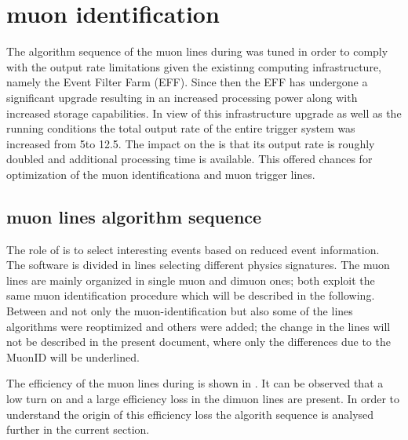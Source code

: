 \section{\hltone muon identification}
\label{sec:hlt1_rev}

The algorithm sequence of the \hltone muon lines during \runone was tuned in order to
comply with the output rate limitations given the existinng computing infrastructure,
namely the Event Filter Farm (EFF).
Since then the EFF has undergone a significant upgrade resulting in an increased processing
power along with increased storage capabilities.
In view of this infrastructure upgrade as well as the \runtwo \lhc running conditions
the total output rate of the entire trigger system was increased
from 5\khz to 12.5\khz.
The impact on the \hltone is that its output rate is roughly doubled and additional processing time is available.
This offered chances for optimization of the \hltone muon identificationa and muon trigger lines.

\subsection{\hltone muon lines algorithm sequence}
\label{sec:hlt1run2}

The role of \hltone is to select interesting events based on reduced event information.
The software is divided in lines selecting different physics signatures.
The \hltone muon lines are mainly organized in single muon and dimuon ones; both
exploit the same muon identification procedure which will be described in the following.
Between \runone and \runtwo not only the muon-identification but also some of the lines algorithms were
reoptimized and others were added; the change in the lines will not be described in the present document,
where only the differences due to the MuonID will be underlined.

The efficiency of the muon lines during \runone is shown in .
It can be observed that a low \pt turn on and a large efficiency loss in the dimuon lines are present.
In order to understand the origin of this efficiency loss
the \hltone algorith sequence is analysed further in the current section.


